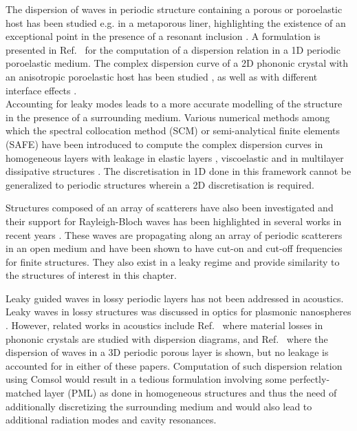 The dispersion of waves in periodic structure containing a porous or poroelastic host has been studied e.g. in a metaporous liner, highlighting the existence of an exceptional point in the presence of a resonant inclusion \cite{xiong2017}. A formulation is presented in Ref.~\cite{wang2019} for the computation of a dispersion relation in a 1D periodic poroelastic medium. The complex dispersion curve of a 2D phononic crystal with an anisotropic poroelastic host has been studied \cite{wang2020}, as well as with different interface effects \cite{zhang2023}.\\

Accounting for leaky modes leads to a more accurate modelling of the structure in the presence of a surrounding medium. Various numerical methods among which the spectral collocation method (SCM) or semi-analytical finite elements (SAFE) have been introduced to compute the complex dispersion curves in homogeneous layers with leakage in elastic layers \cite{kiefer2019, georgiades2022}, viscoelastic \cite{kiefer2020} and in multilayer dissipative structures \cite{marechal2025}. The discretisation in 1D done in this framework cannot be generalized to periodic structures wherein a 2D discretisation is required.

Structures composed of an array of scatterers have also been investigated and their support for Rayleigh-Bloch waves has been highlighted in several works in recent years \cite{porter1999,bennetts2022,matsushima2024,laude2025}. These waves are propagating along an array of periodic scatterers in an open medium and have been shown to have cut-on and cut-off frequencies for finite structures. They also exist in a leaky regime \cite{chaplain2025} and provide similarity to the structures of interest in this chapter.

Leaky guided waves in lossy periodic layers has not been addressed in acoustics. Leaky waves in lossy structures was discussed in optics for plasmonic nanospheres \cite{campione2011}. However, related works in acoustics include Ref.~\cite{laude2013} where material losses in phononic crystals are studied with dispersion diagrams, and Ref.~\cite{magliacano2020} where the dispersion of waves in a 3D periodic porous layer is shown, but no leakage is accounted for in either of these papers. Computation of such dispersion relation using Comsol would result in a tedious formulation involving some perfectly-matched layer (PML) as done in homogeneous structures \cite{gallezot2017, mazzotti2014, mazzotti2017} and thus the need of additionally discretizing the surrounding medium and would also lead to additional radiation modes and cavity resonances. \\

